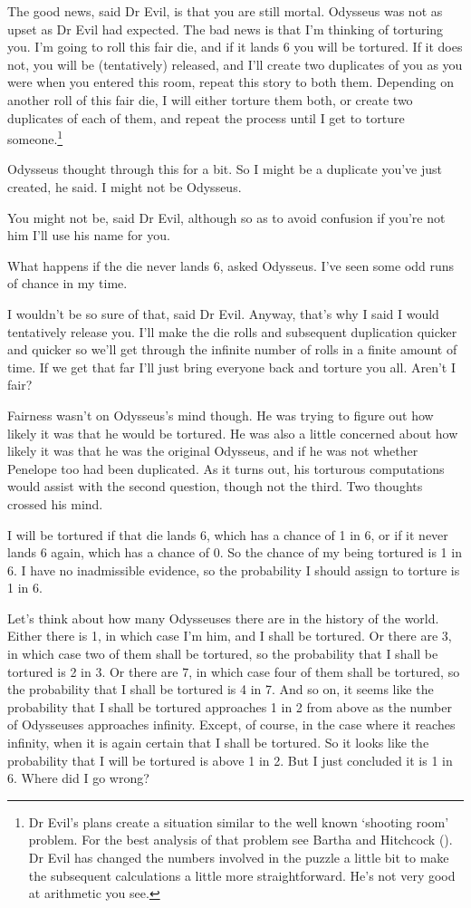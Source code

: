 \documentclass[
  10pt,
  letterpaper,
  DIV=11,
  numbers=noendperiod,
  twoside]{scrartcl}
\begin{document}
The good news, said Dr Evil, is that you are still mortal. Odysseus was
not as upset as Dr Evil had expected. The bad news is that I'm thinking
of torturing you. I'm going to roll this fair die, and if it lands 6 you
will be tortured. If it does not, you will be (tentatively) released,
and I'll create two duplicates of you as you were when you entered this
room, repeat this story to both them. Depending on another roll of this
fair die, I will either torture them both, or create two duplicates of
each of them, and repeat the process until I get to torture
someone.\footnote{Dr Evil's plans create a situation similar to the well
  known `shooting room' problem. For the best analysis of that problem
  see Bartha and Hitchcock (). Dr Evil
  has changed the numbers involved in the puzzle a little bit to make
  the subsequent calculations a little more straightforward. He's not
  very good at arithmetic you see.}

Odysseus thought through this for a bit. So I might be a duplicate
you've just created, he said. I might not be Odysseus.

You might not be, said Dr Evil, although so as to avoid confusion if
you're not him I'll use his name for you.

What happens if the die never lands 6, asked Odysseus. I've seen some
odd runs of chance in my time.

I wouldn't be so sure of that, said Dr Evil. Anyway, that's why I said I
would tentatively release you. I'll make the die rolls and subsequent
duplication quicker and quicker so we'll get through the infinite number
of rolls in a finite amount of time. If we get that far I'll just bring
everyone back and torture you all. Aren't I fair?

Fairness wasn't on Odysseus's mind though. He was trying to figure out
how likely it was that he would be tortured. He was also a little
concerned about how likely it was that he was the original Odysseus, and
if he was not whether Penelope too had been duplicated. As it turns out,
his torturous computations would assist with the second question, though
not the third. Two thoughts crossed his mind.

I will be tortured if that die lands 6, which has a chance of 1 in 6, or
if it never lands 6 again, which has a chance of 0. So the chance of my
being tortured is 1 in 6. I have no inadmissible evidence, so the
probability I should assign to torture is 1 in 6.

Let's think about how many Odysseuses there are in the history of the
world. Either there is 1, in which case I'm him, and I shall be
tortured. Or there are 3, in which case two of them shall be tortured,
so the probability that I shall be tortured is 2 in 3. Or there are 7,
in which case four of them shall be tortured, so the probability that I
shall be tortured is 4 in 7. And so on, it seems like the probability
that I shall be tortured approaches 1 in 2 from above as the number of
Odysseuses approaches infinity. Except, of course, in the case where it
reaches infinity, when it is again certain that I shall be tortured. So
it looks like the probability that I will be tortured is above 1 in 2.
But I just concluded it is 1 in 6. Where did I go wrong?
\end{document}
